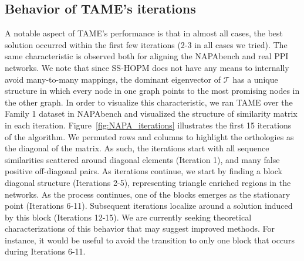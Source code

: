 \documentclass[10pt, journal, compsoc, final]{IEEEtran}
\newcommand{\Tensor}[1]{\mathbf{\mathcal{#1}}}
\begin{document}
\subsection{Behavior of TAME's iterations}
A notable aspect of TAME's performance is that in almost all cases, the best solution occurred
within the first few iterations (2-3 in all cases we tried). The same characteristic is observed both for aligning the NAPAbench and 
real PPI networks. We note that since SS-HOPM does not have any means to internally avoid 
many-to-many mappings, the dominant eigenvector of $\Tensor{T}$ has a unique structure in which 
every node in one graph points to the most promising nodes in the other graph. In order to 
visualize this characteristic, we ran TAME over the Family 1 dataset in NAPAbench and visualized the 
structure of similarity matrix in each iteration. Figure~\ref{fig:NAPA_iterations} illustrates the 
first 15 iterations of the algorithm. We permuted rows and columns to highlight the orthologies as
the diagonal of the matrix. As such, the iterations start with all sequence similarities scattered around 
diagonal elements (Iteration 1), and many false positive off-diagonal pairs. As iterations continue, we start 
by finding a block diagonal structure (Iterations 2-5), representing triangle enriched regions in the networks.
As the process continues, one of the blocks emerges as the stationary point (Iterations 6-11).
Subsequent iterations localize around a solution induced by this block (Iterations 12-15). We are 
currently seeking theoretical characterizations of this behavior that may suggest improved methods.
For instance, it would be useful to avoid the transition to only one block that occurs during
Iterations 6-11.
\end{document}
